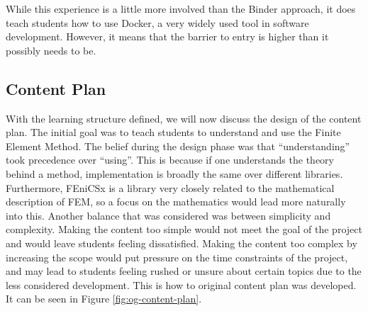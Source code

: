 While this experience is a little more involved than the Binder approach, it does teach students how to use Docker, a very widely used tool in software development. However, it means that the barrier to entry is higher than it possibly needs to be.

\subsection{Content Plan} \label{subsection:content-plan}


With the learning structure defined, we will now discuss the design of the content plan. The initial goal was to teach students to understand and use the Finite Element Method. The belief during the design phase was that ``understanding'' took precedence over ``using''. This is because if one understands the theory behind a method, implementation is broadly the same over different libraries. Furthermore, FEniCSx is a library very closely related to the mathematical description of FEM, so a focus on the mathematics would lead more naturally into this. Another balance that was considered was between simplicity and complexity. Making the content too simple would not meet the goal of the project and would leave students feeling dissatisfied. Making the content too complex by increasing the scope would put pressure on the time constraints of the project, and may lead to students feeling rushed or unsure about certain topics due to the less considered development. This is how to original content plan was developed. It can be seen in Figure \ref{fig:og-content-plan}.

